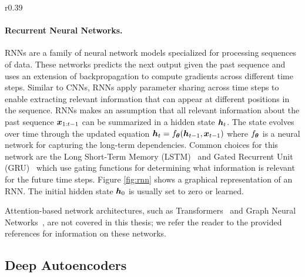 \vspace{-3mm}
\begin{wrapfigure}{r}{0.39\textwidth}
	\centering
	\vspace{-3mm}
	\resizebox{0.39\textwidth}{!}{
		
	}
	\captionsetup{width=.95\linewidth}
	\caption{Graphical representation of RNN.}
	\vspace{-3mm}
	\label{fig:rnn}
\end{wrapfigure}
\paragraph{Recurrent Neural Networks.} RNNs are a family of neural network models specialized for processing sequences of data. These networks predicts the next output given the past sequence and uses an extension of backpropagation to compute gradients across different time steps. 
Similar to CNNs, RNNs apply parameter sharing across time steps to enable extracting relevant information that can appear at different positions in the sequence. RNNs makes an assumption that all relevant information about the past sequence ${\bm{x}}_{1:t-1}$ can be summarized in a hidden state ${\bm{h}}_t$. The state evolves over time through the updated equation ${\bm{h}}_t = f_{{\bm{\theta}}}({\bm{h}}_{t-1}, {\bm{x}}_{t-1})$ where $f_{{\bm{\theta}}}$ is a neural network for capturing the long-term dependencies. Common choices for this network are the Long Short-Term Memory (LSTM)~\cite{hochreiter1997long} and Gated Recurrent Unit (GRU)~\cite{chung2014empirical} which use gating functions for determining what information is relevant for the future time steps. Figure \ref{fig:rnn} shows a graphical representation of an RNN. The initial hidden state ${\bm{h}}_0$ is usually set to zero or learned. 

\vspace{3mm}
\noindent Attention-based network architectures, such as Transformers~\cite{vaswani2017attention, dosovitskiy2020image} and Graph Neural Networks~\cite{battaglia2018relational, zhou2020graph}, are not covered in this thesis; we refer the reader to the provided references for information on these networks.



\subsection{Deep Autoencoders}\label{sec:deep_autoencoders}

